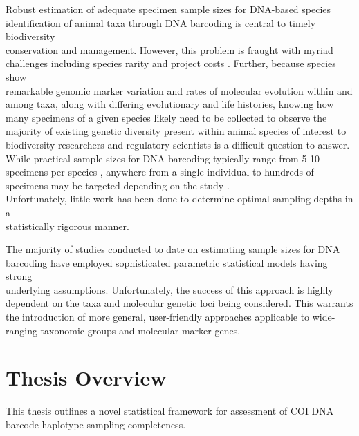 Robust estimation of adequate specimen sample sizes for DNA-based species \\ identification of animal taxa through DNA barcoding is central to timely biodiversity \\ conservation and management. However, this problem is fraught with myriad challenges including species rarity and project costs \cite{cameron2006will, stein2014is}. Further, because species show \\ remarkable genomic marker variation and rates of molecular evolution within and among taxa, along with differing evolutionary and life histories, knowing how many specimens of a given species likely need to be collected to observe the majority of existing genetic diversity present within animal species of interest to biodiversity researchers and regulatory scientists is a difficult question to answer. While practical sample sizes for DNA barcoding typically range from 5-10 specimens per species \cite{zhang2010estimating}, anywhere from a single individual to hundreds of specimens may be targeted depending on the study \cite{hajibabaei2007dna, matz2005likelihood, zhang2010estimating}. \\ Unfortunately, little work has been done to determine optimal sampling depths in a \\ statistically rigorous manner. 



The majority of studies conducted to date on estimating sample sizes for DNA \\ barcoding have employed sophisticated parametric statistical models having strong \\ underlying assumptions. Unfortunately, the success of this approach is highly dependent on the taxa and molecular genetic loci being considered. This warrants the introduction of more general, user-friendly approaches applicable to wide-ranging taxonomic groups and molecular marker genes. 



\section{Thesis Overview} \label{sec:intro1}

This thesis outlines a novel statistical framework for assessment of COI DNA barcode haplotype sampling completeness. 



